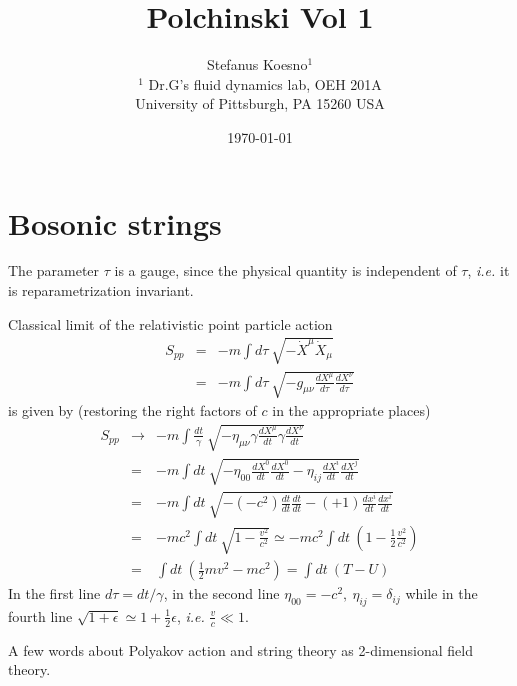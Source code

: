 \documentclass[aps,preprint,preprintnumbers,nofootinbib,showpacs,prd]{revtex4-1}
\newcommand{\ie}{{\it i.e.} }
\newcommand{\nbea}{\begin{eqnarray*}}
\newcommand{\neea}{\end{eqnarray*}}
\begin{document}
\title{Polchinski Vol 1}
\bigskip
\author{Stefanus Koesno$^1$\\
$^1$ Dr.G's fluid dynamics lab, OEH 201A\\ University of Pittsburgh, PA 15260 USA\\
}
%
\date{\today}
%
\begin{abstract}


\end{abstract}
%
\maketitle

\section{Bosonic strings}

\renewcommand{\theequation}{A.\arabic{equation}}  %
\setcounter{equation}{0}  %

The parameter $\tau$ is a gauge, since the physical quantity is independent of $\tau$, \ie it is reparametrization invariant.

Classical limit of the relativistic point particle action
%
\nbea
S_{pp} & = & -m \int d\tau~ \sqrt{-\dot X^\mu \dot X_\mu} \\
& = & -m \int d\tau~ \sqrt{-g_{\mu\nu} \frac{d X^\mu}{d\tau} \frac{dX^\nu}{d\tau}} 
\neea
%
is given by (restoring the right factors of $c$ in the appropriate places)
%
\nbea
S_{pp} & \rightarrow & -m \int \frac{dt}{\gamma}~ \sqrt{-\eta_{\mu\nu} \gamma \frac{d X^\mu}{dt} \gamma \frac{dX^\nu}{dt}} \\
& = & -m \int dt~ \sqrt{-\eta_{00} \frac{d X^0}{dt} \frac{dX^0}{dt} -\eta_{ij} \frac{d X^i}{dt} \frac{dX^j}{dt} } \\
& = & -m \int dt~ \sqrt{-(-c^2) \frac{dt}{dt} \frac{dt}{dt} -(+1) \frac{d x^i}{dt} \frac{dx^i}{dt} } \\
& = & -m c^2 \int dt~ \sqrt{1 - \frac{v^2}{c^2}} \simeq -m c^2 \int dt~ \left ( 1 - \frac{1}{2} \frac{v^2}{c^2} \right ) \\
& = & \int dt~\left ( \frac{1}{2} m v^2 - m c^2 \right ) = \int dt ~ \left ( T - U \right )
\neea
%
In the first line $d\tau = dt /\gamma$, in the second line $\eta_{00} = -c^2,~ \eta_{ij} = \delta_{ij}$ while in the fourth line $\sqrt{1 + \epsilon} \simeq 1 + \frac{1}{2} \epsilon$, \ie $\frac{v}{c} \ll 1$.

A few words about Polyakov action and string theory as 2-dimensional field theory.
\end{document}
